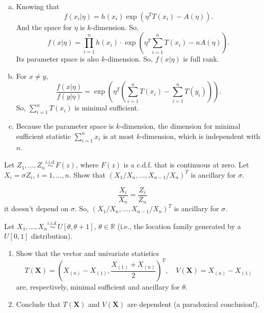 \begin{solution}
    \begin{enumerate}[(a)]
        \item Knowing that 
        \[
            f(x_i|\eta)=h(x_i)\exp\left(\eta^T T(x_i)-A(\eta)\right). 
        \]
        And the space for $\eta$ is $k$-dimension. So, \[
            f(x|\eta)=\prod_{i=1}^n h(x_i)\cdot\exp\left(\eta^T\sum_{i=1}^nT(x_i)-nA(\eta)\right). 
        \]
        Its parameter space is also $k$-dimension. So, $f(x|\eta)$ is full rank. 
        \item For $x\neq y$, 
        \[
            \frac{f(x|\eta)}{f(y|\eta)}=\exp\left(\eta^T\left(\sum_{i=1}^nT(x_i)-\sum_{i=1}^nT(y_i)\right)\right). 
        \]
        So, $\sum_{i=1}^nT(x_i)$ is minimal sufficient. 
        \item Because the parameter space is $k$-dimension, the dimension for minimal sufficient statistic $\sum_{i=1}^nx_i$ is at most $k$-dimension, which is independent with $n$. 
    \end{enumerate}
\end{solution}

\begin{exercise}
    Let \(Z_{1}, \ldots, Z_{n} \stackrel{i.i.d. }{\sim} F(z)\), where \(F(z)\) is a c.d.f. that is continuous at zero. Let \(X_{i}=\sigma Z_{i}\), \(i=1, \ldots, n\). Show that \(\left(X_{1} / X_{n}, \ldots, X_{n-1} / X_{n}\right)^{T}\) is ancillary for \(\sigma\).
\end{exercise}

\begin{solution}
    \[
        \frac{X_i}{X_n}=\frac{Z_i}{Z_n}
    \]
    it doesn't depend on $\sigma$. So, \(\left(X_{1} / X_{n}, \ldots, X_{n-1} / X_{n}\right)^{T}\) is ancillary for \(\sigma\). 
\end{solution}

\begin{exercise}
    Let \(X_{1}, \ldots, X_{n} \stackrel{i.i.d. }{\sim} U[\theta, \theta+1]\), \(\theta \in \mathbb{R}\) (i.e., the location family generated by a \(U[0,1]\) distribution). 
    \begin{enumerate}
        \item Show that the vector and univariate statistics
        \[
        T(\mathbf{X})=\left(X_{(n)}-X_{(1)}, \frac{X_{(1)}+X_{(n)}}{2}\right)^{T}, \quad V(\mathbf{X})=X_{(n)}-X_{(1)}
        \]
        are, respectively, minimal sufficient and ancillary for \(\theta\). 
        \item Conclude that \(T(\mathbf{X})\) and \(V(\mathbf{X})\) are dependent (a paradoxical conclusion!). 
    \end{enumerate}
\end{exercise}

